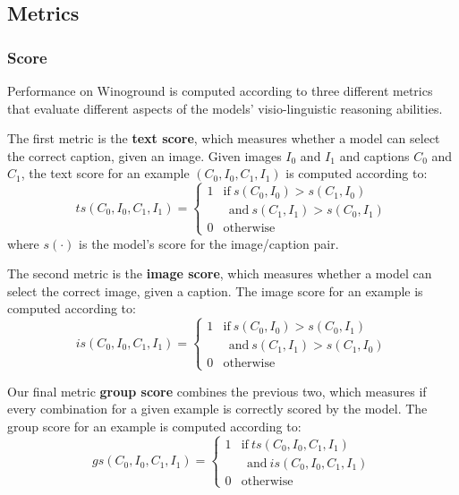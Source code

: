 \subsection{Metrics}

\subsubsection{Score}

Performance on Winoground \cite{thrush2022winoground} is computed according to three different metrics that evaluate different aspects of the models' visio-linguistic reasoning abilities.

The first metric is the \textbf{text score}, which measures whether a model can select the correct caption, given an image. 
Given images $I_0$ and $I_{1}$ and captions $C_{0}$ and $C_{1}$, the text score for an example $(C_{0},I_{0},C_{1},I_{1})$ is computed according to:
\begin{equation}\label{eq:text-score}
        ts(C_{0},I_{0},C_{1},I_{1})= 
    \begin{cases}
        1 & \text{if}\  s(C_{0}, I_{0}) > s(C_{1}, I_{0}) \\
        & \ \ \text{and}\ s(C_{1}, I_{1}) > s(C_{0}, I_{1}) \\
        0              & \text{otherwise}
    \end{cases}
\end{equation}
where $s(\cdot)$ is the model's score for the image/caption pair.

The second metric is the \textbf{image score}, which measures whether a model can select the correct image, given a caption.
The image score for an example is computed according to:
\begin{equation}\label{eq:image-score}
        is(C_{0},I_{0},C_{1},I_{1})= 
    \begin{cases}
        1 & \text{if}\  s(C_{0}, I_{0}) > s(C_{0}, I_{1})\\
        & \ \ \text{and}\ s(C_{1}, I_{1}) > s(C_{1}, I_{0}) \\
        0              & \text{otherwise}
    \end{cases}
\end{equation}

Our final metric \textbf{group score} combines the previous two, which measures if every combination for a given example is correctly scored by the model.
The group score for an example is computed according to:
\begin{equation}\label{eq:group-score}
        gs(C_{0},I_{0},C_{1},I_{1})= 
    \begin{cases}
        1 & \text{if}\  ts(C_{0},I_{0},C_{1},I_{1})  \\
         & \ \ \text{and}\ is(C_{0},I_{0},C_{1},I_{1})\\
        0              & \text{otherwise}
    \end{cases}
\end{equation}

